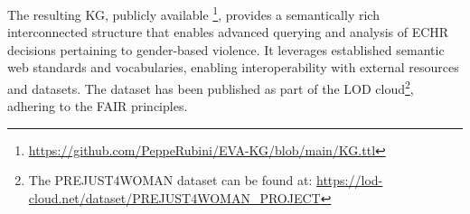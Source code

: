 \documentclass[runningheads]{llncs}
\begin{document}
The resulting KG, publicly available%
\footnote{\url{https://github.com/PeppeRubini/EVA-KG/blob/main/KG.ttl}}, provides a semantically rich interconnected structure that enables advanced querying and analysis of ECHR decisions pertaining to gender-based violence. It leverages established semantic web standards and vocabularies, enabling interoperability with external resources and datasets.
%
The dataset has been published as part of the LOD cloud\footnote{The {PREJUST4WOMAN} dataset can be found at: \url{https://lod-cloud.net/dataset/PREJUST4WOMAN\_PROJECT}}, adhering to the FAIR principles. %
\end{document}
